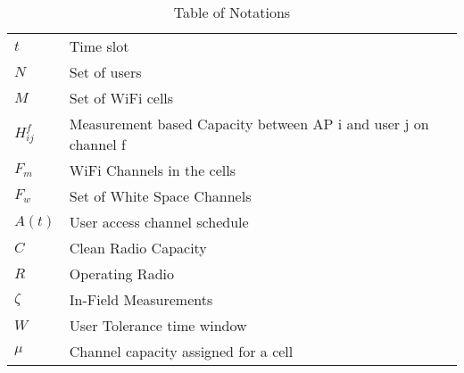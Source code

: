\begin{table}[htbp]
\begin{center}%
\begin{tabular}{l l p{10cm} }
\toprule
$t$ & Time slot\\
$N$ & Set of users\\
$M$ & Set of WiFi cells\\
$H_{ij}^f$ & Measurement based Capacity between AP i and user j on channel f\\
$F_{m}$ & WiFi Channels in the cells\\
$F_{w}$ & Set of White Space Channels\\
$A(t)$ & User access channel schedule\\
$C$ & Clean Radio Capacity\\
$R$ & Operating Radio\\
$\zeta$ & In-Field Measurements\\
$W$ & User Tolerance time window \\
$\mu$ & Channel capacity assigned for a cell \\
\bottomrule
\end{tabular}
\end{center}
\caption{Table of Notations}
\label{tab:notation}
\end{table}
